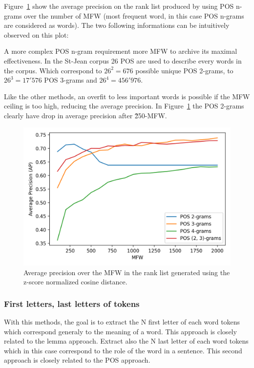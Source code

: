 Figure~\ref{fig:pos_ngrams} show the average precision on the rank list produced by using POS n-grams over the number of MFW (most frequent word, in this case POS n-grams are considered as words).
The two following informations can be intuitively observed on this plot:

A more complex POS n-gram requirement more MFW to archive its maximal effectiveness.
In the St-Jean corpus 26 POS are used to describe every words in the corpus.
Which correspond to $26^2 = 676$ possible unique POS 2-grams, to $26^3 = 17'576$ POS 3-grams and $26^4 = 456'976$.

Like the other methods, an overfit to less important words is possible if the MFW ceiling is too high, reducing the average precision.
In Figure~\ref{fig:pos_ngrams} the POS 2-grams clearly have drop in average precision after \~250-MFW.

\begin{figure}
  \includegraphics[width=\linewidth]{img/pos_ngrams.png}
  \caption{Average precision over the MFW in the rank list generated using the z-score normalized cosine distance.}
  \label{fig:pos_ngrams}
\end{figure}

\subsubsection{First letters, last letters of tokens}

With this methods, the goal is to extract the N first letter of each word tokens which correspond generaly to the meaning of a word.
This approach is closely related to the lemma approach.
Extract also the N last letter of each word tokens which in this case correspond to the role of the word in a sentence.
This second approach is closely related to the POS approach.

